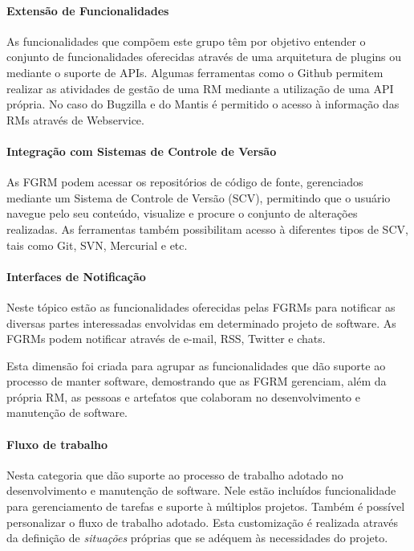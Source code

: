 \paragraph{Extensão de Funcionalidades}
\label{par:extensão_de_funcionalidades}

As funcionalidades que compõem este grupo têm por objetivo entender o conjunto
de funcionalidades oferecidas através de uma arquitetura de plugins ou mediante
o suporte de APIs. Algumas ferramentas como o Github permitem realizar as
atividades de gestão de uma RM mediante a utilização de uma API própria. No caso
do Bugzilla e do Mantis é permitido o acesso à informação das RMs através de
Webservice.

\paragraph{Integração com Sistemas de Controle de Versão}
\label{par:integração_com_sistemas_de_controle_de_versão}

As FGRM podem acessar os repositórios de código de fonte, gerenciados mediante
um Sistema de Controle de Versão (SCV), permitindo que o usuário navegue pelo
seu conteúdo, visualize e procure o conjunto de alterações realizadas. As
ferramentas também possibilitam acesso à diferentes tipos de SCV, tais como Git,
SVN, Mercurial e etc.

\paragraph{Interfaces de Notificação}
\label{par:interfaces_de_notificação}

Neste tópico estão as funcionalidades oferecidas pelas FGRMs para notificar as
diversas partes interessadas envolvidas em determinado projeto de software. As
FGRMs podem notificar através de e-mail, RSS, Twitter e chats.

Esta dimensão foi criada para agrupar as funcionalidades que dão suporte ao
processo de manter software, demostrando que as FGRM gerenciam, além da própria
RM, as pessoas e artefatos que colaboram no desenvolvimento e manutenção de
software.

\paragraph{Fluxo de trabalho}
\label{par:fluxo_de_trabalho}

Nesta categoria que dão suporte ao processo de trabalho adotado no
desenvolvimento e manutenção de software. Nele estão incluídos funcionalidade
para gerenciamento de tarefas e suporte à múltiplos projetos. Também é possível
personalizar o fluxo de trabalho adotado. Esta customização é realizada através
da definição de \textit{situações} próprias que se adéquem às necessidades do
projeto.

